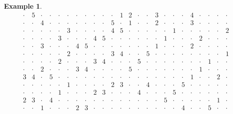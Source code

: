 \documentclass{amsart}
\theoremstyle{definition}
\newtheorem{example}[theorem]{Example}
\begin{document}
\begin{example}
\[{\begin{array}{cccccccccccc|cccccccccccc}
\cdot & 5 & \cdot & \cdot & \cdot & \cdot & \cdot & \cdot & \cdot & \cdot & \cdot & 1 & 2 & \cdot & \cdot & 3 & \cdot & \cdot & \cdot & 4 & \cdot & \cdot & \cdot & \cdot \\
\cdot & \cdot & 4 & \cdot & \cdot & \cdot & \cdot & \cdot & \cdot & \cdot & 5 & \cdot & 1 & \cdot & \cdot & 2 & \cdot & \cdot & \cdot & 3 & \cdot & \cdot & \cdot & \cdot \\
\hline
\cdot & \cdot & \cdot & \cdot & \cdot & 3 & \cdot & \cdot & \cdot & \cdot & 4 & 5 & \cdot & \cdot & \cdot & \cdot & \cdot & 1 & \cdot & \cdot & \cdot & \cdot & \cdot & 2 \\
\cdot & \cdot & \cdot & \cdot & 3 & \cdot & \cdot & \cdot & 4 & 5 & \cdot & \cdot & \cdot & \cdot & \cdot & \cdot & 1 & \cdot & \cdot & \cdot & 2 & \cdot & \cdot & \cdot \\
\cdot & \cdot & 3 & \cdot & \cdot & \cdot & 4 & 5 & \cdot & \cdot & \cdot & \cdot & \cdot & \cdot & \cdot & 1 & \cdot & \cdot & \cdot & 2 & \cdot & \cdot & \cdot & \cdot \\
\cdot & \cdot & \cdot & \cdot & \cdot & 2 & \cdot & \cdot & \cdot & \cdot & 3 & 4 & \cdot & \cdot & 5 & \cdot & \cdot & \cdot & \cdot & \cdot & \cdot & \cdot & \cdot & 1 \\
\cdot & \cdot & \cdot & \cdot & 2 & \cdot & \cdot & \cdot & 3 & 4 & \cdot & \cdot & \cdot & 5 & \cdot & \cdot & \cdot & \cdot & \cdot & \cdot & \cdot & 1 & \cdot & \cdot \\
\cdot & \cdot & 2 & \cdot & \cdot & \cdot & 3 & 4 & \cdot & \cdot & \cdot & \cdot & 5 & \cdot & \cdot & \cdot & \cdot & \cdot & \cdot & \cdot & 1 & \cdot & \cdot & \cdot \\
3 & 4 & \cdot & 5 & \cdot & \cdot & \cdot & \cdot & \cdot & \cdot & \cdot & \cdot & \cdot & \cdot & \cdot & \cdot & \cdot & \cdot & \cdot & 1 & \cdot & \cdot & 2 & \cdot \\
\cdot & \cdot & \cdot & \cdot & \cdot & 1 & \cdot & \cdot & \cdot & \cdot & 2 & 3 & \cdot & \cdot & 4 & \cdot & \cdot & \cdot & 5 & \cdot & \cdot & \cdot & \cdot & \cdot \\
\cdot & \cdot & \cdot & \cdot & 1 & \cdot & \cdot & \cdot & 2 & 3 & \cdot & \cdot & \cdot & 4 & \cdot & \cdot & \cdot & 5 & \cdot & \cdot & \cdot & \cdot & \cdot & \cdot \\
2 & 3 & \cdot & 4 & \cdot & \cdot & \cdot & \cdot & \cdot & \cdot & \cdot & \cdot & \cdot & \cdot & \cdot & \cdot & 5 & \cdot & \cdot & \cdot & \cdot & \cdot & 1 & \cdot \\
\cdot & \cdot & 1 & \cdot & \cdot & \cdot & 2 & 3 & \cdot & \cdot & \cdot & \cdot & \cdot & \cdot & \cdot & \cdot & \cdot & \cdot & 4 & \cdot & \cdot & 5 & \cdot & \cdot \\

\end{array}}\]
\end{example}
\end{document}
